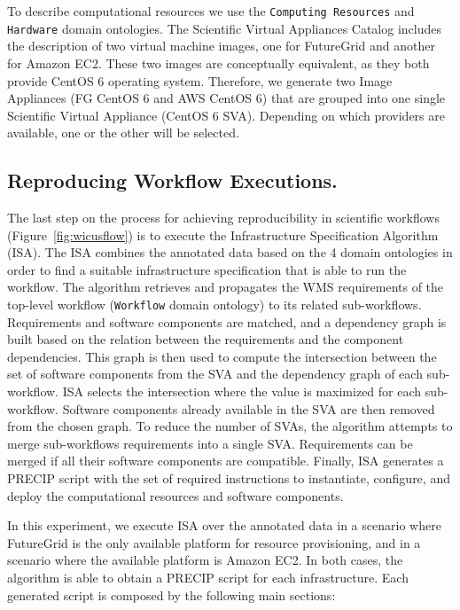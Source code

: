 To describe computational resources we use the \texttt{Computing Resources} and \texttt{Hardware} domain ontologies. The Scientific Virtual Appliances Catalog includes the description of two virtual machine images, one for FutureGrid and another for Amazon EC2. These two images are conceptually equivalent, as they both provide CentOS 6 operating system.
Therefore, we generate two Image Appliances (FG CentOS 6 and AWS CentOS 6) that are grouped into one single Scientific Virtual Appliance (CentOS 6 SVA). Depending on which providers are available, one or the other will be selected.


\subsection{Reproducing Workflow Executions.}

The last step on the process for achieving reproducibility in scientific workflows (Figure~\ref{fig:wicusflow}) is to execute the Infrastructure Specification Algorithm (ISA). The ISA combines the annotated data based on the 4 domain ontologies in order to find a suitable infrastructure specification that is able to run the workflow. The algorithm retrieves and propagates the WMS requirements of the top-level workflow (\texttt{Workflow} domain ontology) to its related sub-workflows. Requirements and software components are matched, and a dependency graph is built based on the relation between the requirements and the component dependencies. This graph is then used to compute the intersection between the set of software components from the SVA and the dependency graph of each sub-workflow. ISA selects the intersection where the value is maximized for each sub-workflow. Software components already available in the SVA are then removed from the chosen graph. To reduce the number of SVAs, the algorithm attempts to merge sub-workflows requirements into a single SVA. Requirements can be merged if all their software components are compatible. Finally, ISA generates a PRECIP script with the set of required instructions to instantiate, configure, and deploy the computational resources and software components.


In this experiment, we execute ISA over the annotated data in a scenario where FutureGrid is the only available platform for resource provisioning, and in a scenario where the available platform is Amazon EC2. In both cases, the algorithm is able to obtain a PRECIP script for each infrastructure. Each generated script is composed by the following main sections:


